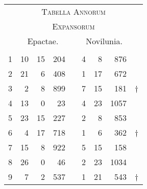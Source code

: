%
\begin{tabnums} %
\normalsize
\centering
\setlength{\tabcolsep}{1.0ex}
%
\newcommand{\cwd}{3.2em}
\newcommand{\da}{{\tiny †}}
\newcommand{\db}{{\scriptsize o}}
\newcommand{\ang}{90}
\newcommand{\hsc}[1]{\small{#1}}
\newcommand{\hsb}[1]{\scriptsize{#1}}
\newcommand{\hsa}[1]{\tiny{#1}}
%
\newcommand{\hdrB}{%
  ~ &
  \multicolumn{3}{c}{\hsb{Epactae.}} &
  &
  \multicolumn{3}{c}{\hsb{Novilunia.}}  
}
%
\newcommand{\hdrA}{%
  \ch{888}{\hsa{Anni expansi}} &
  \ch{81}{\hsa{Epact.}}&
  \ch{88}{\hsa{Hor.}} &
  \ch{1888}{\hsa{Scrup.}} &
  &
  \ch{81}{\hsa{Feria.}} &
  \ch{88}{\hsa{Hor.}} &
  \ch{1888}{\hsa{Scrup.}}
}
%
\newcommand{\hdrs}{%
\hdrB \\
\cmidrule(lr){2-4} \cmidrule(lr){6-8}
\hdrA \\
}
%
\begin{tabular}[c]{@{} r rrr c rrr l@{}}
\toprule
\multicolumn{9}{c}{\Large\textsc{Tabella Annorum}} \\
\multicolumn{9}{c}{\large\textsc{Expansorum}} \\
\toprule
\hdrs %
\midrule
 1 & 10 & 15 &  204 && 4 &  8 &  876 & ~\\
 2 & 21 &  6 &  408 && 1 & 17 &  672 & ~\\
 3 &  2 &  8 &  899 && 7 & 15 &  181 & \da \\
 4 & 13 &  0 &   23 && 4 & 23 & 1057 & ~\\
 5 & 23 & 15 &  227 && 2 &  8 &  853 & ~\\
 6 &  4 & 17 &  718 && 1 &  6 &  362 & \da \\
 7 & 15 &  8 &  922 && 5 & 15 &  158 & ~\\
 8 & 26 &  0 &   46 && 2 & 23 & 1034 & ~\\
 9 &  7 &  2 &  537 && 1 & 21 &  543 & \da \\

\end{tabular}
\end{tabnums}
